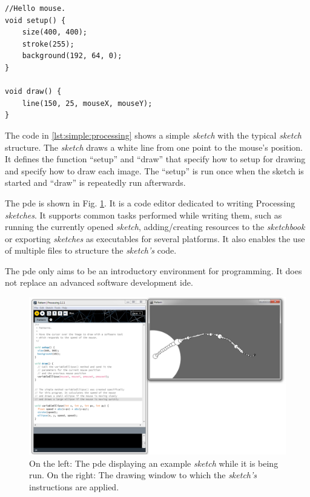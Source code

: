 \documentclass{./llncs2e/llncs}
\begin{document}
	\lstset{ %
		basicstyle=\tt\small,
		numbers=left,
		numberstyle=\tt\small,
		frame=lines,
	}
	\begin{lstlisting}[caption={A simple Processing sketch.},label={lst:simple:processing},float]
//Hello mouse.
void setup() {
	size(400, 400);
	stroke(255);
	background(192, 64, 0);
}

void draw() {
	line(150, 25, mouseX, mouseY);
}
	\end{lstlisting}
	
	The code in \ref{lst:simple:processing} shows a simple \emph{sketch} with the typical \emph{sketch} structure. 
	The \emph{sketch} draws a white line from one point to the mouse's position. 
	It defines the function ``setup'' and  ``draw'' that specify how to setup for drawing and specify how to draw each image. 
	The ``setup'' is run once when the sketch is started and ``draw'' is repeatedly run afterwards.
	
	The \ac{pde} is shown in Fig. \ref{fig:proc:dev:env}. 
	It is a code editor dedicated to writing Processing \emph{sketches}. 
	It supports common tasks performed while writing them, such as running the currently opened \emph{sketch}, adding/creating resources to the \emph{sketchbook} or exporting \emph{sketches} as executables for several platforms. 
	It also enables the use of multiple files to structure the \emph{sketch's} code.
	
	The \ac{pde} only aims to be an introductory environment for programming. 
	It does not replace an advanced software development \ac{ide}.
	
	\begin{figure}
		\centering
		\includegraphics[width=1.0\textwidth]{img/proc_dev_env}
		\caption{On the left: The \ac{pde} displaying an example \emph{sketch} while it is being run. On the right: The drawing window to which the \emph{sketch's} instructions are applied.}
		\label{fig:proc:dev:env}
	\end{figure} 
	
\end{document}
